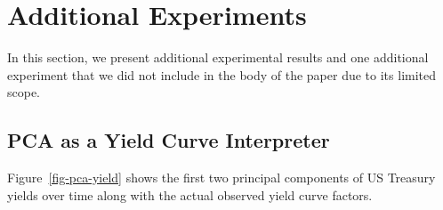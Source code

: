 \documentclass{article}
\theoremstyle{plain}
\theoremstyle{definition}
\theoremstyle{remark}
\begin{document}








\newpage
\appendix
\section{Additional Experiments}

In this section, we present additional experimental results and one additional experiment that we did not include in the body of the paper due to its limited scope.

\subsection{PCA as a Yield Curve Interpreter}

Figure~\ref{fig-pca-yield} shows the first two principal components of US Treasury yields over time along with the actual observed yield curve factors.
\end{document}
